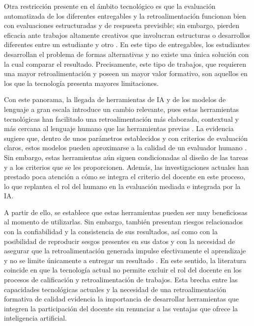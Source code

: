 \documentclass[letterpaper, 10 pt, conference]{ieeeconf}  %
\begin{document}
    Otra restricción presente en el ámbito tecnológico es que la evaluación automatizada de los diferentes entregables y la retroalimentación funcionan bien con evaluaciones estructuradas y de respuesta previsible; sin embargo, pierden eficacia ante trabajos altamente creativos que involucran estructuras o desarrollos diferentes entre un estudiante y otro \cite{15}. En este tipo de entregables, los estudiantes desarrollan el problema de formas alternativas y no existe una única solución con la cual comparar el resultado. Precisamente, este tipo de trabajos, que requieren una mayor retroalimentación y poseen un mayor valor formativo, son aquellos en los que la tecnología presenta mayores limitaciones.

    Con este panorama, la llegada de herramientas de IA y de los modelos de lenguaje a gran escala introduce un cambio relevante, pues estas herramientas tecnológicas han facilitado una retroalimentación más elaborada, contextual y más cercana al lenguaje humano que las herramientas previas \cite{16}. La evidencia sugiere que, dentro de unos parámetros establecidos y con criterios de evaluación claros, estos modelos pueden aproximarse a la calidad de un evaluador humano \cite{16}. Sin embargo, estas herramientas aún siguen condicionadas al diseño de las tareas y a los criterios que se les proporcionen. Además, las investigaciones actuales han prestado poca atención a cómo se integra el criterio del docente en este proceso, lo que replantea el rol del humano en la evaluación mediada e integrada por la IA.

    A partir de ello, se establece que estas herramientas pueden ser muy beneficiosas al momento de utilizarlas. Sin embargo, también presentan riesgos relacionados con la confiabilidad y la consistencia de sus resultados, así como con la posibilidad de reproducir sesgos presentes en sus datos y con la necesidad de asegurar que la retroalimentación generada impulse efectivamente el aprendizaje y no se limite únicamente a entregar un resultado \cite{17}. En este sentido, la literatura coincide en que la tecnología actual no permite excluir el rol del docente en los procesos de calificación y retroalimentación de trabajos. Esta brecha entre las capacidades tecnológicas actuales y la necesidad de una retroalimentación formativa de calidad evidencia la importancia de desarrollar herramientas que integren la participación del docente sin renunciar a las ventajas que ofrece la inteligencia artificial.
\end{document}
